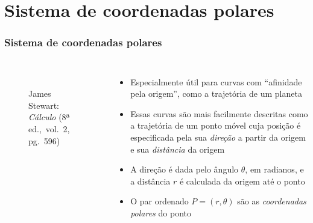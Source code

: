 \documentclass[pdftex, brazil, aspectratio=169]{beamer}
\begin{document}
\section{Sistema de coordenadas polares}

\begin{frame}[t]
  \frametitle{Sistema de coordenadas polares}
  \begin{columns}
    \centering
    \begin{figure}[H]
      \begin{center}
        \label{fig:int2-07}
        \\
        \footnotesize{James Stewart: \emph{Cálculo} (8ª ed.,\ vol.\ 2, pg.\ 596)}
      \end{center}
    \end{figure}
    \begin{itemize}
      \item Especialmente útil para curvas com ``afinidade pela
            origem'', como a trajetória de um planeta
      \item Essas curvas são mais facilmente descritas como a
            trajetória de um ponto móvel cuja posição é especificada
            pela sua \emph{direção} a partir da origem e sua
            \emph{distância} da origem
      \item A direção é dada pelo ângulo $\theta$, em radianos, e a
            distância $r$ é calculada da origem até o ponto
      \item O par ordenado $P=(r,\theta)$ são as \emph{coordenadas
            polares} do ponto
    \end{itemize}
  \end{columns}
\end{frame}
\end{document}
